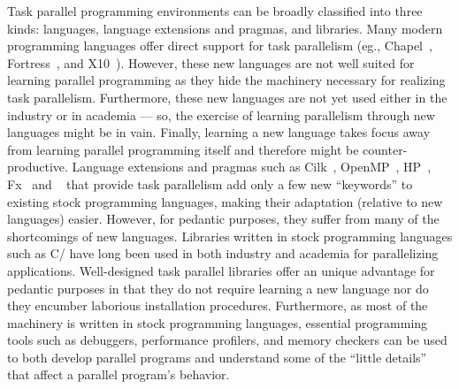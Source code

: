 \documentclass[9pt,twocolumn,letter]{article}
\begin{document}
Task parallel programming environments can be broadly classified into three
kinds: languages, language extensions and pragmas, and libraries.
Many modern programming languages offer direct support for task parallelism
(eg., Chapel~\cite{Chamberlain:2007p1040}, Fortress~\cite{fortress}, and
X10~\cite{Charles:2005p1232}).
%
However, these new languages are not well suited for learning parallel
programming as they hide the machinery necessary for realizing task
parallelism.
%
Furthermore, these new languages are not yet used either in the industry or in
academia --- so, the exercise of learning parallelism through new languages 
might be in vain.
%
Finally, learning a new language takes focus away from learning parallel
programming itself and therefore might be counter-productive.
Language extensions and pragmas such as Cilk~\cite{FrigoLeRa98},
OpenMP~\cite{kn:omp_30}, HP\Cpp{}~\cite{gannon:hpc}, Fx~\cite{Gross:1994} and
\Charmpp{}~\cite{Kale93charm++:a} that provide task parallelism add only a few
new ``keywords'' to existing stock programming languages, making their
adaptation (relative to new languages) easier.
%
However, for pedantic purposes, they suffer from many of the shortcomings of
new languages.
Libraries written in stock programming languages such as C/\Cpp{} have long 
been used in both industry and academia for parallelizing applications.
%
Well-designed task parallel libraries offer an unique advantage for pedantic
purposes in that they do not require learning a new language nor do they
encumber laborious installation procedures.
%
Furthermore, as most of the machinery is written in stock programming
languages, essential programming tools such as debuggers, performance
profilers, and memory checkers can be used to both develop parallel programs
and understand some of the ``little details'' that affect a parallel program's
behavior.

%
%
%
\end{document}

